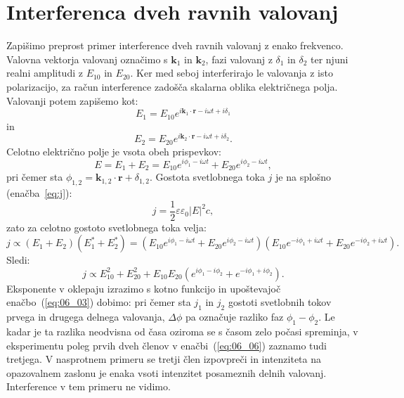 \section{Interferenca dveh ravnih valovanj}
Zapišimo preprost primer interference dveh ravnih valovanj z enako frekvenco. Valovna
vektorja valovanj označimo s $\mathbf{k}_1$ in $\mathbf{k}_2$, fazi valovanj z 
$\delta_1$ in $\delta_2$ ter njuni realni amplitudi z $E_{10}$ in $E_{20}$. Ker med
seboj interferirajo le valovanja z isto polarizacijo, 
za račun interference zadošča skalarna oblika električnega polja.
Valovanji potem zapišemo kot:
\begin{equation}
E_1 = E_{10} e^{i\mathbf{k}_1 \cdot \mathbf{r} - i \omega t + i \delta_1}
\end{equation}
in
\begin{equation}
E_2 = E_{20} e^{i\mathbf{k}_2 \cdot \mathbf{r} - i \omega t + i \delta_2}.
\label{eq:06_01}
\end{equation}
Celotno
električno polje je vsota obeh prispevkov:
\begin{equation}
E = E_1 + E_2 = E_{10} e^{i\phi_1 - i \omega t} + E_{20} e^{i\phi_2 - i \omega t},
\label{eq:06_02}
\end{equation}
pri čemer sta $\phi_{1,2} = \mathbf{k}_{1,2} \cdot \mathbf{r} + \delta_{1,2}$. 
Gostota svetlobnega toka $j$ je na splošno (enačba~\ref{eq:j}):
\begin{equation}
j = \frac{1}{2}\varepsilon \varepsilon_0 |E|^2c,
\label{eq:06_03}
\end{equation}
zato za celotno gostoto svetlobnega toka velja:
\begin{equation}
j \propto (E_1+E_2)(E_1^*+E_2^*)  = 
\left( E_{10} e^{i\phi_1 - i \omega t} + E_{20} e^{i\phi_2 - i \omega t}\right)
\left( E_{10} e^{-i\phi_1 + i \omega t} + E_{20} e^{-i\phi_2 + i \omega t}\right)\!.
\label{eq:06_04}
\end{equation}
Sledi:
\begin{equation}
j \propto E_{10}^2 + E_{20}^2 + E_{10}E_{20} \left(e^{i\phi_1-i\phi_2}+ e^{-i\phi_1+i\phi_2}\right)\!.
\label{eq:06_05}
\end{equation}
Eksponente v oklepaju izrazimo s kotno funkcijo in upoštevajoč enačbo~(\ref{eq:06_03}) dobimo:
pri čemer sta $j_1$ in $j_2$ gostoti svetlobnih tokov prvega in drugega delnega valovanja,
$\Delta \phi$ pa označuje razliko faz $\phi_1-\phi_2$. Le kadar je ta razlika neodvisna
od časa oziroma se s časom zelo počasi spreminja, v eksperimentu poleg prvih dveh členov
v enačbi~(\ref{eq:06_06}) zaznamo tudi tretjega. V nasprotnem primeru se tretji člen 
izpovpreči in intenziteta na opazovalnem zaslonu je enaka vsoti intenzitet posameznih 
delnih valovanj. Interference v tem primeru ne vidimo. 

